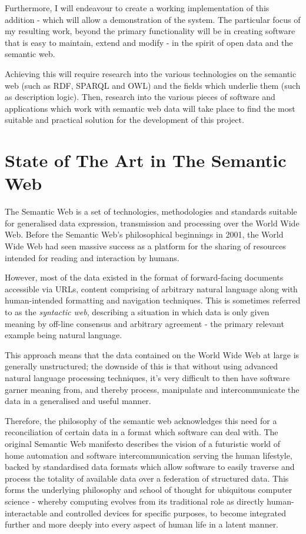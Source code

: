 \documentclass{article}
\begin{document}
Furthermore, I will endeavour to create a working implementation of this
addition - which will allow a demonstration of the system. The particular 
focus of my resulting work, beyond the primary functionality
will be in creating software that is easy to maintain, extend and modify - in
the spirit of open data and the semantic web.

Achieving this will require research into the various technologies on the
semantic web (such as RDF, SPARQL and OWL) and the fields which underlie them
(such as description logic). Then, research into the various pieces of software
and applications which work with semantic web data will take place to find the
most suitable and practical solution for the development of this project.

\section{State of The Art in The Semantic Web}

The Semantic Web is a set of technologies, methodologies and standards suitable for
generalised data expression, transmission and processing over the World Wide
Web. Before the Semantic Web's philosophical beginnings in
2001, the World Wide Web had seen massive success as a platform for the
sharing of resources intended for reading and interaction by humans.

However, most of the data existed in the format of forward-facing 
documents accessible via URLs, content comprising of arbitrary natural language
along with human-intended formatting and navigation techniques. This is
sometimes referred to as the \emph{syntactic web}, describing a situation in
which data is only given meaning by off-line consensus and arbitrary agreement -
the primary relevant example being natural language.\cite{syntweb}

This approach means that the data contained on the World Wide Web at large is
generally unstructured; the downside of this is that without using advanced 
natural language processing techniques, it's very difficult to then have
software garner meaning from, and thereby process, manipulate and intercommunicate 
the data in a generalised and useful manner.

Therefore, the philosophy of the semantic web acknowledges this need for a
reconciliation of certain data in a format which software can deal with. The
original Semantic Web manifesto\cite{semweb} describes the vision of a 
futuristic world of home automation and software intercommunication serving 
the human lifestyle, backed by standardised data formats which allow software to 
easily traverse and process the totality of available data over a federation
of structured data. This forms the
underlying philosophy and school of thought for ubiquitous computer science -
whereby computing evolves from its traditional role as directly
human-interactable and controlled devices for specific purposes, to become
integrated further and more deeply into every aspect of human life 
in a latent manner.
\end{document}
